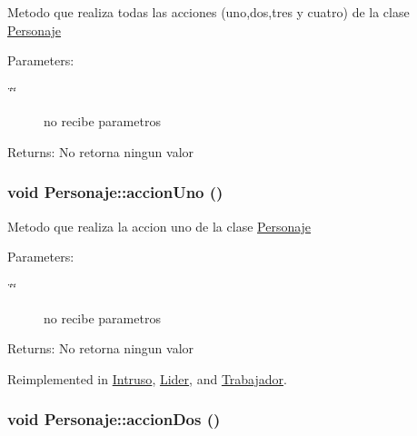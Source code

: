 Metodo que realiza todas las acciones (uno,dos,tres y cuatro) de la clase \hyperlink{classPersonaje}{Personaje} \begin{Desc}
\item[Parameters:]
\begin{description}
\item[{\em \char`\"{}\char`\"{}}]no recibe parametros \end{description}
\end{Desc}
\begin{Desc}
\item[Returns:]No retorna ningun valor \end{Desc}
\hypertarget{classPersonaje_0454b75ccc8f7e33f03e2cfb2c59e725}{
\subsubsection[accionUno]{\setlength{\rightskip}{0pt plus 5cm}void Personaje::accionUno ()}}
\label{classPersonaje_0454b75ccc8f7e33f03e2cfb2c59e725}


Metodo que realiza la accion uno de la clase \hyperlink{classPersonaje}{Personaje} \begin{Desc}
\item[Parameters:]
\begin{description}
\item[{\em \char`\"{}\char`\"{}}]no recibe parametros \end{description}
\end{Desc}
\begin{Desc}
\item[Returns:]No retorna ningun valor \end{Desc}


Reimplemented in \hyperlink{classIntruso_dee71b00225e294086d8980625a32ab3}{Intruso}, \hyperlink{classLider_2729cb612e6ca2d2750f48b85743107e}{Lider}, and \hyperlink{classTrabajador_ea6e8089295c87f0b5a5014895f28526}{Trabajador}.\hypertarget{classPersonaje_af7763eb6099390038b7833129a1ef9f}{
\subsubsection[accionDos]{\setlength{\rightskip}{0pt plus 5cm}void Personaje::accionDos ()}}
\label{classPersonaje_af7763eb6099390038b7833129a1ef9f}


